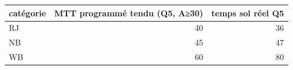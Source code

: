 \begin{tabular}{lrr}
\toprule
catégorie & MTT programmé tendu (Q5, A≥30) & temps sol réel Q5 \\
\midrule
RJ & 40 & 36 \\
NB & 45 & 47 \\
WB & 60 & 80 \\
\bottomrule
\end{tabular}

